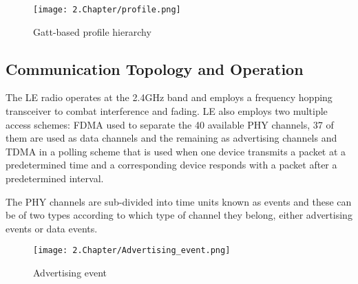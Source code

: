 \begin{figure}[H]
	\centering
		\texttt{[image: 2.Chapter/profile.png]}
	\caption[Gatt-based profile hierarchy]{Gatt-based profile hierarchy}
	\label{fig:profile}
\end{figure}


\subsection{Communication Topology and Operation}
\label{subsec:Communication}

The \ac{LE} radio operates at the 2.4GHz band and employs a frequency hopping transceiver to combat interference and fading. \ac{LE} also employs two multiple access schemes: \ac{FDMA} used to separate the 40 available \ac{PHY} channels, 37 of them are used as data channels and the remaining as advertising channels and \ac{TDMA} in a polling scheme that is used when one device transmits a packet at a predetermined time and a corresponding device responds with a packet after a predetermined interval.

The \ac{PHY} channels are sub-divided into time units known as events and these can be of two types according to which type of channel they belong, either advertising events or data events. 

\begin{figure}[H]
	\centering
		\texttt{[image: 2.Chapter/Advertising\_event.png]}
	\caption[Advertising event]{Advertising event}
	\label{fig:ad_event}
\end{figure}

